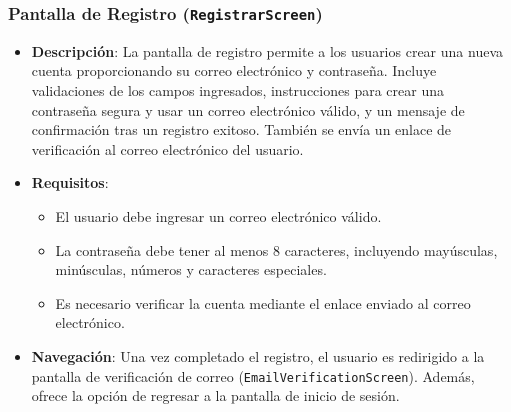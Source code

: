 \documentclass{article}
\begin{document}
\begin{flushleft}
\clearpage

\subsubsection{Pantalla de Registro (\texttt{RegistrarScreen})}
\begin{itemize}
    \item \textbf{Descripci\'on}: 
    La pantalla de registro permite a los usuarios crear una nueva cuenta proporcionando su correo electr\'onico y contrase\~na. Incluye validaciones de los campos ingresados, instrucciones para crear una contrase\~na segura y usar un correo electr\'onico v\'alido, y un mensaje de confirmaci\'on tras un registro exitoso. Tambi\'en se env\'ia un enlace de verificaci\'on al correo electr\'onico del usuario.

    \item \textbf{Requisitos}: 
    \begin{itemize}
        \item El usuario debe ingresar un correo electr\'onico v\'alido.
        \item La contrase\~na debe tener al menos 8 caracteres, incluyendo may\'usculas, min\'usculas, n\'umeros y caracteres especiales.
        \item Es necesario verificar la cuenta mediante el enlace enviado al correo electr\'onico.
    \end{itemize}

    \item \textbf{Navegaci\'on}: 
    Una vez completado el registro, el usuario es redirigido a la pantalla de verificaci\'on de correo (\texttt{EmailVerificationScreen}). Adem\'as, ofrece la opci\'on de regresar a la pantalla de inicio de sesi\'on.


\end{itemize}
\end{flushleft}
\end{document}
